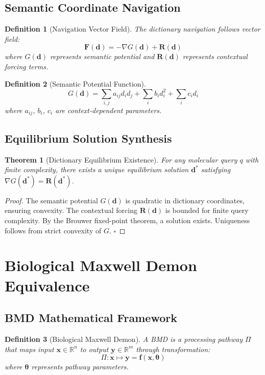 \documentclass[12pt,a4paper]{article}
\newtheorem{theorem}{Theorem}
\newtheorem{definition}{Definition}
\begin{document}
\subsection{Semantic Coordinate Navigation}

\begin{definition}[Navigation Vector Field]
The dictionary navigation follows vector field:
$$\mathbf{F}(\mathbf{d}) = -\nabla G(\mathbf{d}) + \mathbf{R}(\mathbf{d})$$
where $G(\mathbf{d})$ represents semantic potential and $\mathbf{R}(\mathbf{d})$ represents contextual forcing terms.
\end{definition}

\begin{definition}[Semantic Potential Function]
$$G(\mathbf{d}) = \sum_{i,j} a_{ij} d_i d_j + \sum_i b_i d_i^2 + \sum_i c_i d_i$$
where $a_{ij}$, $b_i$, $c_i$ are context-dependent parameters.
\end{definition}

\subsection{Equilibrium Solution Synthesis}

\begin{theorem}[Dictionary Equilibrium Existence]
For any molecular query $q$ with finite complexity, there exists a unique equilibrium solution $\mathbf{d}^*$ satisfying $\nabla G(\mathbf{d}^*) = \mathbf{R}(\mathbf{d}^*)$.
\end{theorem}

\begin{proof}
The semantic potential $G(\mathbf{d})$ is quadratic in dictionary coordinates, ensuring convexity. The contextual forcing $\mathbf{R}(\mathbf{d})$ is bounded for finite query complexity. By the Brouwer fixed-point theorem, a solution exists. Uniqueness follows from strict convexity of $G$. $\square$
\end{proof}

\section{Biological Maxwell Demon Equivalence}

\subsection{BMD Mathematical Framework}

\begin{definition}[Biological Maxwell Demon]
A BMD is a processing pathway $\Pi$ that maps input $\mathbf{x} \in \mathbb{R}^n$ to output $\mathbf{y} \in \mathbb{R}^m$ through transformation:
$$\Pi: \mathbf{x} \mapsto \mathbf{y} = \mathbf{f}(\mathbf{x}, \boldsymbol{\theta})$$
where $\boldsymbol{\theta}$ represents pathway parameters.
\end{definition}
\end{document}
